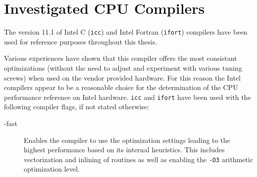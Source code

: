 % 
% 

\clearpage
\section{Investigated CPU Compilers} \label{sec:investigatedCPUCompilers}

The version 11.1 of Intel C (\verb|icc|) and Intel Fortran (\verb|ifort|) compilers have been used for reference purposes throughout this thesis. 


Various experiences have shown that this compiler offers the most consistant optimizations (without the need to adjust and experiment with various tuning screws) when used on the vendor provided hardware. For this reason the Intel compilers appear to be a reasonable choice for the determination of the CPU performance reference on Intel hardware. \verb|icc| and \verb|ifort| have been used with the following compiler flags, if not stated otherwise: 

\begin{description}
 \item [-fast] Enables the compiler to use the optimization settings leading to the highest performance based on its internal heuristics. This includes vectorization and inlining of routines as well as enabling the \verb|-O3| arithmetic optimization level.
\end{description}


